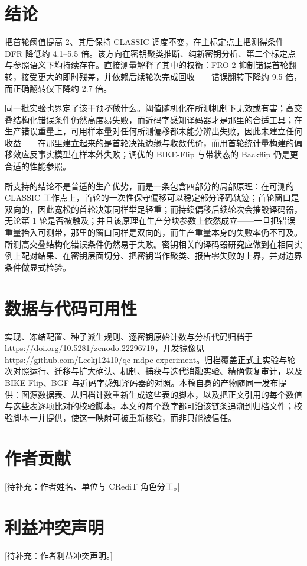 \documentclass[UTF8,a4paper,10pt,twocolumn]{ctexart}
\begin{document}
\section{结论}\label{sec:conclusion}

把首轮阈值提高 2、其后保持 CLASSIC 调度不变，在主标定点上把测得条件 DFR 降低约 4.1--5.5 倍。该方向在密钥聚类推断、纯新密钥分析、第二个标定点与参照语义下均持续存在。直接测量解释了其中的权衡：FRO-2 抑制错误首轮翻转，接受更大的即时残差，并依赖后续轮次完成回收——错误翻转下降约 9.5 倍，而正确翻转仅下降约 2.7 倍。

同一批实验也界定了该干预\emph{不}做什么。阈值随机化在所测机制下无效或有害；高交叠结构化错误条件仍然高度易失败，而近码字感知译码器才是那里的合适工具；在生产错误重量上，可用样本量对任何所测偏移都未能分辨出失败，因此未建立任何收益——在那里建立起来的是首轮决策边缘与收敛代价，而用首轮统计量构建的偏移效应反事实模型在样本外失败；调优的 BIKE-Flip 与带状态的 Backflip 仍是更合适的性能参照。

所支持的结论不是普适的生产优势，而是一条包含四部分的局部原理：在可测的 CLASSIC 工作点上，首轮的一次性保守偏移可以稳定部分译码轨迹；首轮窗口是双向的，因此宽松的首轮决策同样举足轻重；而持续偏移后续轮次会摧毁译码器，无论第 1 轮是否被触及；并且该原理在生产分块参数上依然成立——一旦把错误重量抬入可测带，那里的窗口同样是双向的，而生产重量本身的失败率仍不可及。所测高交叠结构化错误条件仍然易于失败。密钥相关的译码器研究应做到在相同实例上配对结果、在密钥层面切分、把密钥当作聚类、报告零失败的上界，并对边界条件做显式检验。

\section*{数据与代码可用性}
实现、冻结配置、种子派生规则、逐密钥原始计数与分析代码归档于 \url{https://doi.org/10.5281/zenodo.22296719}，开发镜像见 \url{https://github.com/Leekj12410/qc-mdpc-experiment}。归档覆盖正式主实验与轮次对照运行、迁移与扩大确认、机制、捕获与迭代消融实验、精确恢复审计，以及 BIKE-Flip、BGF 与近码字感知译码器的对照。本稿自身的产物随同一发布提供：图源数据表、从归档计数重新生成这些表的脚本，以及把正文引用的每个数值与这些表逐项比对的校验脚本。本文的每个数字都可沿该链条追溯到归档文件；校验脚本一并提供，使这一映射可被重新核验，而非只能被信任。

\section*{作者贡献}
[待补充：作者姓名、单位与 CRediT 角色分工。]

\section*{利益冲突声明}
[待补充：作者利益冲突声明。]



\end{document}
